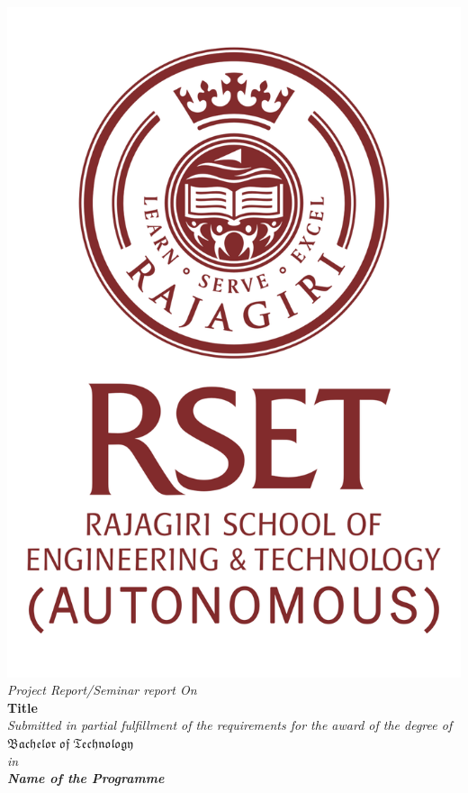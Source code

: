 	\begin{center}
		\includegraphics[scale=0.35]{Figures/logo1.png}\\[0.5cm]
		\large \textit{Project Report/Seminar report On}\\[0.5cm]
		\Large \textbf{Title}\\[0.5cm]
		\textit{Submitted in partial fulfillment of the
			requirements for the award of the degree of}\\[0.5cm]
		{\huge {$\mathfrak {Bachelor\; of\; Technology}$}}\\[.5cm]
		\textit{in}\\[.5cm]
		{\Large \bf \itshape{{Name of the Programme}}}\\[1cm]

\end{center}
